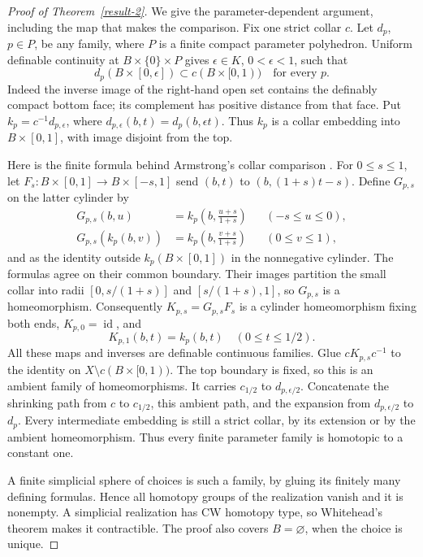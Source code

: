 \documentclass[11pt,a4paper]{article}
\theoremstyle{definition}
\DeclareMathOperator{\id}{id}
\begin{document}
\begin{proof}[Proof of Theorem~\ref{result-2}]
We give the parameter-dependent argument, including the map that makes
the comparison. Fix one strict collar $c$. Let $d_p$, $p\in P$, be any
family, where $P$ is a finite compact parameter polyhedron. Uniform
definable continuity at $B\times\{0\}\times P$ gives
$\epsilon\in K$, $0<\epsilon<1$, such that
\[
 d_p(B\times[0,\epsilon])\subset c(B\times[0,1))
 \quad\text{for every }p.
\]
Indeed the inverse image of the right-hand open set contains the
definably compact bottom face; its complement has positive distance
from that face. Put $k_p=c^{-1}d_{p,\epsilon}$, where
$d_{p,\epsilon}(b,t)=d_p(b,\epsilon t)$. Thus $k_p$ is a collar
embedding into $B\times[0,1]$, with image disjoint from the top.

Here is the finite formula behind Armstrong's collar comparison
\cite[Theorem 2, pp.~123--124]{Armstrong1970}. For $0\leq s\leq1$,
let $F_s:B\times[0,1]\to B\times[-s,1]$ send
$(b,t)$ to $(b,(1+s)t-s)$. Define $G_{p,s}$ on the latter cylinder by
\[
\begin{aligned}
 G_{p,s}(b,u)&=k_p\left(b,\frac{u+s}{1+s}\right)
 &&(-s\leq u\leq0),\\
 G_{p,s}(k_p(b,v))&=k_p\left(b,\frac{v+s}{1+s}\right)
 &&(0\leq v\leq1),
\end{aligned}
\]
and as the identity outside $k_p(B\times[0,1])$ in the nonnegative
cylinder. The formulas agree on their common boundary. Their images
partition the small collar into radii $[0,s/(1+s)]$ and
$[s/(1+s),1]$, so $G_{p,s}$ is a homeomorphism. Consequently
$K_{p,s}=G_{p,s}F_s$ is a cylinder homeomorphism fixing both ends,
$K_{p,0}=\id$, and
\[
 K_{p,1}(b,t)=k_p(b,t)\quad(0\leq t\leq1/2).
\]
All these maps and inverses are definable continuous families. Glue
$cK_{p,s}c^{-1}$ to the identity on $X\setminus c(B\times[0,1))$.
The top boundary is fixed, so this is an ambient family of homeomorphisms.
It carries $c_{1/2}$ to $d_{p,\epsilon/2}$. Concatenate the shrinking
path from $c$ to $c_{1/2}$, this ambient path, and the expansion from
$d_{p,\epsilon/2}$ to $d_p$. Every intermediate embedding is still a
strict collar, by its extension or by the ambient homeomorphism.
Thus every finite parameter family is homotopic to a constant one.

A finite simplicial sphere of choices is such a family, by gluing its
finitely many defining formulas. Hence all homotopy groups of the
realization vanish and it is nonempty. A simplicial realization has
CW homotopy type, so Whitehead's theorem makes it contractible.
The proof also covers $B=\varnothing$, when the choice is unique.
\end{proof}
\end{document}
